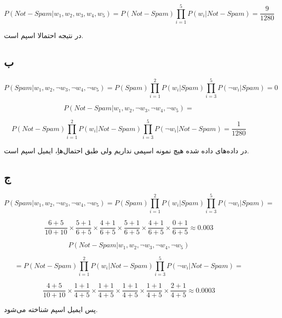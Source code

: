 $$
P(Not - Spam | w_1 , w_2 , w_3 , w_4 , w_5) = P(Not - Spam) \prod_{i=1}^5 P(w_i | Not - Spam) = \frac{9}{1280} 
$$

در نتیجه احتمالا اسپم است.

\subsection*{ب}

$$
P(Spam | w_1 , w_2 , \neg w_3 , \neg w_4 , \neg w_5) = P(Spam) \prod_{i=1}^2 P(w_i | Spam) \prod_{i=3}^5 P(\neg w_i | Spam) = 0
$$

$$
P(Not - Spam | w_1 , w_2 , \neg w_3 , \neg w_4 , \neg w_5) = 
$$

$$
P(Not - Spam) \prod_{i=1}^2 P(w_i | Not - Spam) \prod_{i=3}^5 P(\neg w_i | Not - Spam) = \frac{1}{1280}
$$

در داده‌های داده شده هیچ نمونه اسپمی نداریم  ولی طبق احتمال‌هاِ، ایمیل اسپم است.

\subsection*{ج}

$$
P(Spam | w_1 , w_2 , \neg w_3 , \neg w_4 , \neg w_5) = P(Spam) \prod_{i=1}^2 P(w_i | Spam) \prod_{i=3}^5 P(\neg w_i | Spam) =
$$

$$
\frac{6+5}{10+10} \times \frac{5+1}{6+5} \times \frac{4+1}{6+5} \times \frac{5+1}{6+5} \times \frac{4+1}{6+5} \times \frac{0+1}{6+5} \approx 0.003
$$



$$
P(Not - Spam | w_1 , w_2 , \neg w_3 , \neg w_4 , \neg w_5) 
$$

$$
= P(Not - Spam) \prod_{i=1}^2 P(w_i | Not - Spam) \prod_{i=3}^5 P(\neg w_i | Not - Spam) =
$$

$$
\frac{4+5}{10+10} \times \frac{1+1}{4+5} \times \frac{1+1}{4+5} \times \frac{1+1}{4+5} \times \frac{1+1}{4+5} \times \frac{2+1}{4+5} \approx 0.0003
$$

پس ایمیل اسپم شناخته می‌شود.

